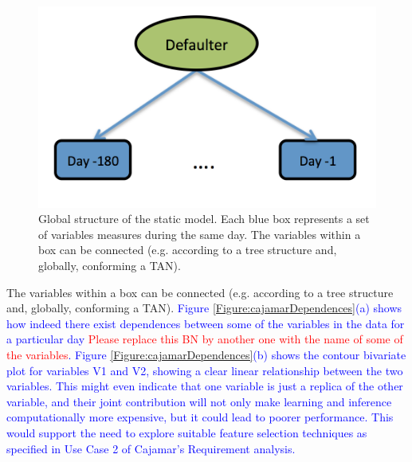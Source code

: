 \begin{figure}
\begin{center}
\includegraphics[scale=0.45]{./figures/CajaMarModel0}
\caption{\label{Figure:CajaMarStatic}Global structure of the static model. Each blue box represents a set of variables measures during the same day.
The variables within a box can be connected (e.g. according to a tree structure and, globally, conforming a TAN).}
\label{fig:static}
\end{center}
\end{figure}

The variables within a box can be connected (e.g. according to a tree structure and, globally, conforming a TAN). \textcolor{blue}{Figure \ref{Figure:cajamarDependences}(a) shows how indeed there exist dependences between some of the variables in the data for a particular day \textcolor{red}{Please replace this BN by another one with the name of some of the variables}. Figure \ref{Figure:cajamarDependences}(b) shows the contour bivariate plot for variables V1 and V2, showing a clear linear relationship between the two variables. This might even indicate that one variable is just a replica of the other variable, and their joint contribution will not only make learning and inference computationally more expensive, but it could lead to poorer performance. This would support the need to explore suitable feature selection techniques as specified in Use Case 2 of Cajamar's Requirement analysis.}

